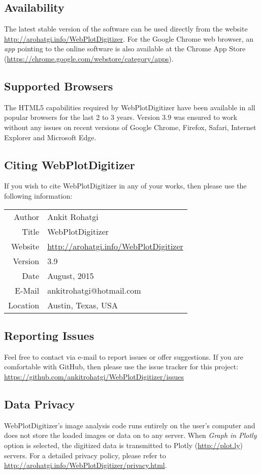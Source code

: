 \documentclass[letterpaper, 10pt]{article}
\begin{document}
\subsection{Availability}
The latest stable version of the software can be used directly from the website \url{http://arohatgi.info/WebPlotDigitizer}. For the Google Chrome web browser, an \emph{app} pointing to the online software is also available at the Chrome App Store (\url{https://chrome.google.com/webstore/category/apps}).

\subsection{Supported Browsers}
The HTML5 capabilities required by WebPlotDigitizer have been available in all popular browsers for the last 2 to 3 years. Version 3.9 was ensured to work without any issues on recent versions of Google Chrome, Firefox, Safari, Internet Explorer and Microsoft Edge.


\subsection{Citing WebPlotDigitizer}
If you wish to cite WebPlotDigitizer in any of your works, then please use the following information:

\begin{center}
\begin{tabular}{|r|l|}
\hline
Author & Ankit Rohatgi\\
Title & WebPlotDigitizer\\
Website & \url{http://arohatgi.info/WebPlotDigitizer}\\
Version & 3.9\\
Date & August, 2015\\
E-Mail & ankitrohatgi@hotmail.com\\
Location & Austin, Texas, USA\\
\hline
\end{tabular}
\end{center}

\subsection{Reporting Issues}
Feel free to contact via e-mail to report issues or offer suggestions. If you are comfortable with GitHub, then please use the issue tracker for this project: \url{https://github.com/ankitrohatgi/WebPlotDigitizer/issues}

\subsection{Data Privacy}
WebPlotDigitizer's image analysis code runs entirely on the user's computer and does not store the loaded images or data on to any server. When \emph{Graph in Plotly} option is selected, the digitized data is transmitted to Plotly (\url{http://plot.ly}) servers. For a detailed privacy policy, please refer to \url{http://arohatgi.info/WebPlotDigitizer/privacy.html}.
\end{document}
